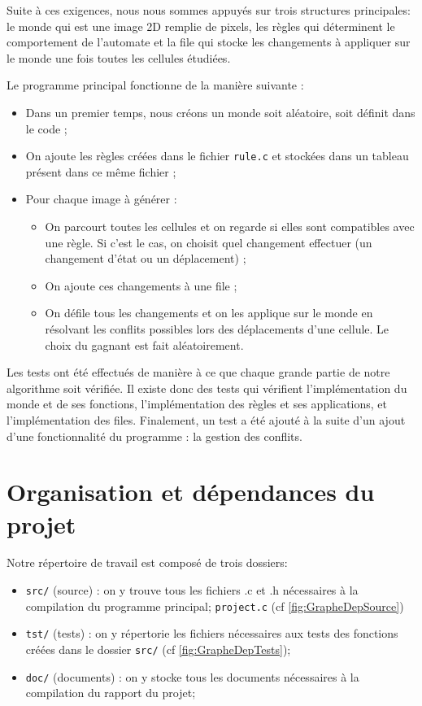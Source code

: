 Suite à ces exigences, nous nous sommes appuyés sur trois structures principales: le monde qui est une image 2D remplie de pixels, les règles qui déterminent le comportement de l'automate et la file qui stocke les changements à appliquer sur le monde une fois toutes les cellules étudiées.

Le programme principal fonctionne de la manière suivante :
\begin{itemize}
    \item Dans un premier temps, nous créons un monde soit aléatoire, soit définit dans le code ;
    \item On ajoute les règles créées dans le fichier \texttt{rule.c} et stockées dans un tableau présent dans ce même fichier ;
    \item Pour chaque image à générer :
    \begin{itemize}
        \item On parcourt toutes les cellules et on regarde si elles sont compatibles avec une règle. Si c'est le cas, on choisit quel changement effectuer (un changement d'état ou un déplacement) ;
        \item On ajoute ces changements à une file ;
        \item On défile tous les changements et on les applique sur le monde en résolvant les conflits possibles lors des déplacements d'une cellule. Le choix du gagnant est fait aléatoirement.
    \end{itemize}
\end{itemize}     
\vspace{\parskip}

Les tests ont été effectués de manière à ce que chaque grande partie de notre algorithme soit vérifiée. Il existe donc des tests qui vérifient l'implémentation du monde et de ses fonctions, l'implémentation des règles et ses applications, et l'implémentation des files. Finalement, un test a été ajouté à la suite  d'un ajout d'une fonctionnalité du programme : la gestion des conflits.

\section{Organisation et dépendances du projet}

Notre répertoire de travail est composé de trois dossiers:
\begin{itemize}
    \item \texttt{src/} (source) : on y trouve tous les fichiers .c et .h nécessaires à la compilation du programme principal; \texttt{project.c} (cf \ref{fig:GrapheDepSource})
    \item \texttt{tst/} (tests) : on y répertorie les fichiers nécessaires aux tests des fonctions créées dans le dossier \texttt{src/} (cf \ref{fig:GrapheDepTests});
    \item \texttt{doc/} (documents) : on y stocke tous les documents nécessaires à la compilation du rapport du projet;
\end{itemize}

